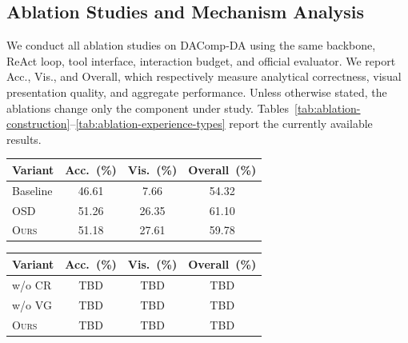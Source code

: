 \documentclass{article}
\newcommand{\floatstacksep}{\vspace{6pt}}
\newcommand{\method}{\textsc{Ours}}
\newcommand{\headpct}{(\%)}
\begin{document}
\subsection{Ablation Studies and Mechanism Analysis}
\label{sec:ablations}

We conduct all ablation studies on DAComp-DA using the same backbone, ReAct loop, tool interface, interaction budget, and official evaluator.
We report Acc., Vis., and Overall, which respectively measure analytical correctness, visual presentation quality, and aggregate performance.
Unless otherwise stated, the ablations change only the component under study.
Tables~\ref{tab:ablation-construction}--\ref{tab:ablation-experience-types} report the currently available results.

\begin{table}
  \vspace{-8pt}
  \centering
  \scriptsize
  \setlength{\tabcolsep}{5pt}
  \begin{minipage}{\linewidth}
    \centering
    \label{tab:ablation-construction}
    \begin{tabular}{@{}lccc@{}}
      \toprule
      Variant & Acc.~\headpct & Vis.~\headpct & Overall~\headpct \\
      \midrule
      Baseline & 46.61 & 7.66 & 54.32 \\
      OSD & 51.26 & 26.35 & 61.10 \\
      \method{} & 51.18 & 27.61 & 59.78 \\
      \bottomrule
    \end{tabular}
  \end{minipage}

  \floatstacksep

  \begin{minipage}{\linewidth}
    \centering
    \label{tab:ablation-iterative}
    \begin{tabular}{@{}lccc@{}}
      \toprule
      Variant & Acc.~\headpct & Vis.~\headpct & Overall~\headpct \\
      \midrule
      w/o CR & TBD & TBD & TBD \\
      w/o VG & TBD & TBD & TBD \\
      \method{} & TBD & TBD & TBD \\
      \bottomrule
    \end{tabular}
  \end{minipage}


\end{table}
\end{document}
